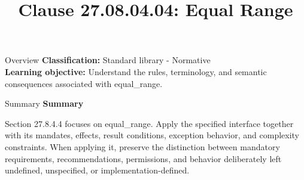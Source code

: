 \documentclass[10pt,letterpaper]{article}
\title{Clause 27.08.04.04: Equal Range}
\author{}
\date{}
\begin{document}
\maketitle
\begin{CornellOverviewBox}{Overview}
\textbf{Classification:} Standard library - Normative\\[2pt]
\textbf{Learning objective:} Understand the rules, terminology, and semantic consequences associated with equal\_range.
\end{CornellOverviewBox}\begin{CornellSummaryBox}{Summary}
{\sffamily\bfseries\color{Accent} Summary}\par\vspace{3pt}Section 27.8.4.4 focuses on equal\_range. Apply the specified interface together with its mandates, effects, result conditions, exception behavior, and complexity constraints. When applying it, preserve the distinction between mandatory requirements, recommendations, permissions, and behavior deliberately left undefined, unspecified, or implementation-defined.
\end{CornellSummaryBox}
\end{document}
